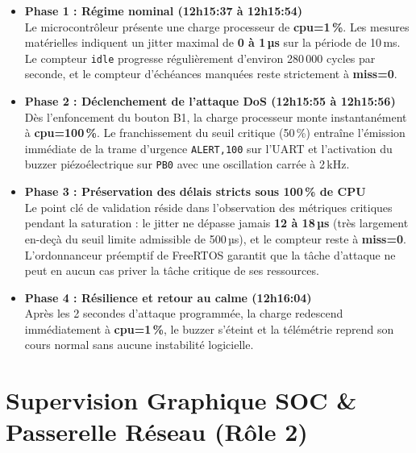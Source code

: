 \documentclass[a4paper,11pt]{article}
\begin{document}
\begin{itemize}[leftmargin=1.5em]
  \item \textbf{Phase 1 : Régime nominal (12h15:37 à 12h15:54)} \\
  Le microcontrôleur présente une charge processeur de \textbf{cpu=1\,\%}. Les mesures matérielles indiquent un jitter maximal de \textbf{0 à 1\,µs} sur la période de 10\,ms. Le compteur \texttt{idle} progresse régulièrement d'environ 280\,000 cycles par seconde, et le compteur d'échéances manquées reste strictement à \textbf{miss=0}.

  \item \textbf{Phase 2 : Déclenchement de l'attaque DoS (12h15:55 à 12h15:56)} \\
  Dès l'enfoncement du bouton B1, la charge processeur monte instantanément à \textbf{cpu=100\,\%}. Le franchissement du seuil critique (50\,\%) entraîne l'émission immédiate de la trame d'urgence \texttt{ALERT,100} sur l'UART et l'activation du buzzer piézoélectrique sur \texttt{PB0} avec une oscillation carrée à 2\,kHz.

  \item \textbf{Phase 3 : Préservation des délais stricts sous 100\,\% de CPU} \\
  Le point clé de validation réside dans l'observation des métriques critiques pendant la saturation : le jitter ne dépasse jamais \textbf{12 à 18\,µs} (très largement en-deçà du seuil limite admissible de 500\,µs), et le compteur reste à \textbf{miss=0}. L'ordonnanceur préemptif de FreeRTOS garantit que la tâche d'attaque ne peut en aucun cas priver la tâche critique de ses ressources.

  \item \textbf{Phase 4 : Résilience et retour au calme (12h16:04)} \\
  Après les 2 secondes d'attaque programmée, la charge redescend immédiatement à \textbf{cpu=1\,\%}, le buzzer s'éteint et la télémétrie reprend son cours normal sans aucune instabilité logicielle.
\end{itemize}

\section{Supervision Graphique SOC \& Passerelle Réseau (Rôle 2)}
\end{document}
